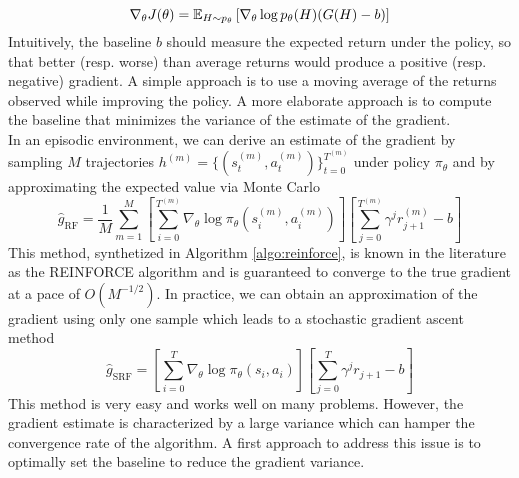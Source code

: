 \begin{equation}
\label{eq:gradient_MC_baseline}
	\nabla_\theta J(\theta) = \E[H \sim p_\theta]{\nabla_\theta \log p_\theta(H)(G(H)-b)}
\end{equation}
Intuitively, the baseline $b$ should measure the expected return under the policy, so that better (resp. worse) than average returns would produce a positive (resp. negative) gradient. A simple approach is to use a moving average of the returns observed while improving the policy. A more elaborate approach is to compute the baseline that minimizes the variance of the estimate of the gradient.\\
In an episodic environment, we can derive an estimate of the gradient by sampling $M$ trajectories $h^{(m)} = \{(s_t^{(m)}, a_t^{(m)})\}_{t = 0}^{T^{(m)}}$ under policy $\pi_\theta$ and by approximating the expected value via Monte Carlo
\begin{equation}
\label{eq:reinforce_gradient}
	\widehat{g}_{\text{RF}} = \frac{1}{M} \sum^{M}_{m=1} \left[ \sum_{i=0}^{T^{(m)}} 
	\nabla_\theta \log \pi_\theta(s_i^{(m)}, a_i^{(m)}) \right] \left[
	\sum^{T^{(m)}}_{j=0} \gamma^j r_{j+1}^{(m)} - b \right]  
\end{equation}
This method, synthetized in Algorithm \ref{algo:reinforce}, is known in the literature as the REINFORCE algorithm and is guaranteed to converge to the true gradient at a pace of $O(M^{-1/2})$. In practice, we can obtain an approximation of the gradient using only one sample which leads to a stochastic gradient ascent method
\begin{equation}
	\widehat{g}_{\text{SRF}} = \left[ \sum_{i=0}^{T} \nabla_\theta \log \pi_\theta(s_i, 
	a_i) \right] \left[ \sum^{T}_{j=0} \gamma^j r_{j+1} - b \right]  
\end{equation}
This method is very easy and works well on many problems. However, the gradient
estimate is characterized by a large variance which can hamper the convergence
rate of the algorithm. A first approach to address this issue is to optimally
set the baseline to reduce the gradient variance.

